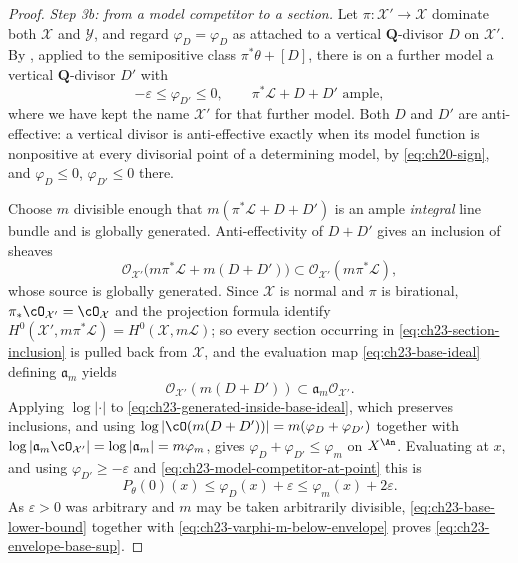 \begin{proof}
\emph{Step 3b: from a model competitor to a section.}
Let \(\pi:\mathcal X'\to\mathcal X\) dominate both \(\mathcal X\) and
\(\mathcal Y\), and regard \(\varphi_D=\varphi_{D}\) as attached to a
vertical \(\mathbf Q\)-divisor \(D\) on \(\mathcal X'\).  By
, applied to the semipositive class
\(\pi^*\theta+[D]\), there is on a further model a vertical
\(\mathbf Q\)-divisor \(D'\) with
\begin{equation}\label{eq:ch23-small-ample-correction}
     -\varepsilon\leq\varphi_{D'}\leq0,
     \qquad
     \pi^*\mathcal L+D+D'\text{ ample},
\end{equation}
where we have kept the name \(\mathcal X'\) for that further model.  Both
\(D\) and \(D'\) are anti-effective: a vertical divisor is anti-effective
exactly when its model function is nonpositive at every divisorial point of
a determining model, by \eqref{eq:ch20-sign}, and
\(\varphi_D\leq0\), \(\varphi_{D'}\leq0\) there.

Choose \(m\) divisible enough that \(m(\pi^*\mathcal L+D+D')\) is an ample
\emph{integral} line bundle and is globally generated.  Anti-effectivity of
\(D+D'\) gives an inclusion of sheaves
\begin{equation}\label{eq:ch23-section-inclusion}
 \mathcal O_{\mathcal X'}
       \bigl(m\pi^*\mathcal L+m(D+D')\bigr)
 \subset
 \mathcal O_{\mathcal X'}(m\pi^*\mathcal L),
\end{equation}
whose source is globally generated.  Since \(\mathcal X\) is normal and
\(\pi\) is birational, \(\pi_*\cO_{\mathcal X'}=\cO_{\mathcal X}\) and the
projection formula identify
\(H^0(\mathcal X',m\pi^*\mathcal L)=H^0(\mathcal X,m\mathcal L)\); so every
section occurring in \eqref{eq:ch23-section-inclusion} is pulled back from
\(\mathcal X\), and the evaluation map \eqref{eq:ch23-base-ideal} defining
\(\mathfrak a_m\) yields
\begin{equation}\label{eq:ch23-generated-inside-base-ideal}
       \mathcal O_{\mathcal X'}(m(D+D'))
       \subset\mathfrak a_m\mathcal O_{\mathcal X'} .
\end{equation}
Applying \(\log|\cdot|\) to
\eqref{eq:ch23-generated-inside-base-ideal}, which preserves inclusions, and
using \(\log|\cO(m(D+D'))|=m(\varphi_D+\varphi_{D'})\) together with
\(\log|\mathfrak a_m\cO_{\mathcal X'}|=\log|\mathfrak a_m|=m\varphi_m\),
gives \(\varphi_D+\varphi_{D'}\leq\varphi_m\) on \(X^{\An}\).  Evaluating at
\(x\), and using \(\varphi_{D'}\geq-\varepsilon\) and
\eqref{eq:ch23-model-competitor-at-point} this is
\begin{equation}\label{eq:ch23-base-lower-bound}
 P_\theta(0)(x)
 \leq\varphi_D(x)+\varepsilon
 \leq\varphi_m(x)+2\varepsilon.
\end{equation}
As \(\varepsilon>0\) was arbitrary and \(m\) may be taken arbitrarily
divisible, \eqref{eq:ch23-base-lower-bound} together with
\eqref{eq:ch23-varphi-m-below-envelope} proves
\eqref{eq:ch23-envelope-base-sup}.


\end{proof}
